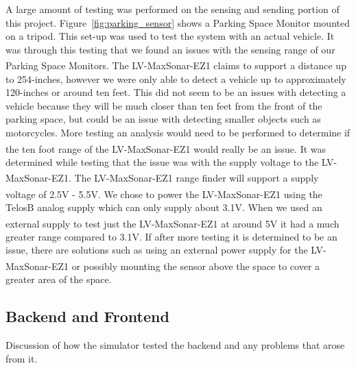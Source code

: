 \documentclass{acm_proc}
\begin{document}
A large amount of testing was performed on the sensing and sending portion of this project.  Figure~\ref{fig:parking_sensor}  shows a Parking Space Monitor mounted on a tripod.  This set-up was used to test the system with an actual vehicle.  It was through this testing that we found an issues with the sensing range of our Parking Space Monitors.  The LV-MaxSonar\textsuperscript{\textregistered}-EZ1\textsuperscript{\texttrademark} claims to support a distance up to 254-inches, however we were only able to detect a vehicle up to approximately 120-inches or around ten feet.  This did not seem to be an issues with detecting a vehicle because they will be much closer than ten feet from the front of the parking space, but could be an issue with detecting smaller objects such as motorcycles.  More testing an analysis would need to be performed to determine if the ten foot range of the LV-MaxSonar\textsuperscript{\textregistered}-EZ1\textsuperscript{\texttrademark} would really be an issue.  It was determined while testing that the issue was with the supply voltage to the LV-MaxSonar\textsuperscript{\textregistered}-EZ1\textsuperscript{\texttrademark}.  The LV-MaxSonar\textsuperscript{\textregistered}-EZ1\textsuperscript{\texttrademark} range finder will support a supply voltage of 2.5V - 5.5V.  We chose to power the LV-MaxSonar\textsuperscript{\textregistered}-EZ1\textsuperscript{\texttrademark} using the TelosB analog supply which can only supply about 3.1V.  When we used an external supply to test just the LV-MaxSonar\textsuperscript{\textregistered}-EZ1\textsuperscript{\texttrademark} at around 5V it had a much greater range compared to 3.1V. If after more testing it is determined to be an issue, there are solutions such as using an external power supply for the LV-MaxSonar\textsuperscript{\textregistered}-EZ1\textsuperscript{\texttrademark} or possibly mounting the sensor above the space to cover a greater area of the space. 





\subsection{Backend and Frontend}

Discussion of how the simulator tested the backend and any problems that
arose from it.
\end{document}
